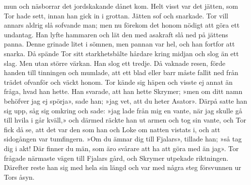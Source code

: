 mun och näsborrar det jordskakande dånet kom. Helt visst var det jätten,
som Tor hade sett, innan han gick in i grottan. Jätten sof och snarkade.
Tor vill annars aldrig slå sofvande man; men nu förekom det honom nödigt
att göra ett undantag. Han lyfte hammaren och lät den med asakraft slå
ned på jättens panna. Denne grinade litet i sömnen, men pannan var hel,
och
\protect\hypertarget{lb1625905.xhtmlux5cux23start42}{}{}\protect\hypertarget{lb1625905.xhtmlux5cux23start42-a}{}{}\protect\hypertarget{lb1625905.xhtmlux5cux23start42-b}{}{}\protect\hypertarget{lb1625905.xhtmlux5cux23start42-c}{}{}\protect\hypertarget{lb1625905.xhtmlux5cux23start42-d}{}{}
han fortfor att snarka. Då spände Tor sitt starkhetsbälte hårdare kring
midjan och slog än ett slag. Men utan större värkan. Han slog ett
tredje. Då vaknade resen, förde handen till tinningen och mumlade, att
ett blad eller barr måste fallit ned från trädet ofvanför och väckt
honom. Tor kände sig häpen och visste ej annat än fråga, hvad han hette.
Han svarade, att han hette Skrymer; »men om ditt namn behöfver jag ej
spörja», sade han; »jag vet, att du heter Asator». Därpå satte han sig
upp, såg sig omkring och sade: »jag lade från mig en vante, när jag
skulle gå till hvila i går kväll,» och därmed räckte han ut armen och
tog sin vante, och Tor fick då se, att det var den som han och Loke om
natten vistats i, och att sidogången var tumfingern. »Om du ämnar dig
till Fjalars», tillade han; »så tag dig i akt! Där finner du män, som
äro svårare att ha att göra med än jag». Tor frågade närmaste vägen till
Fjalars gård, och Skrymer utpekade riktningen. Därefter reste han sig
med hela sin längd och var med några steg försvunnen ur Tors åsyn.


